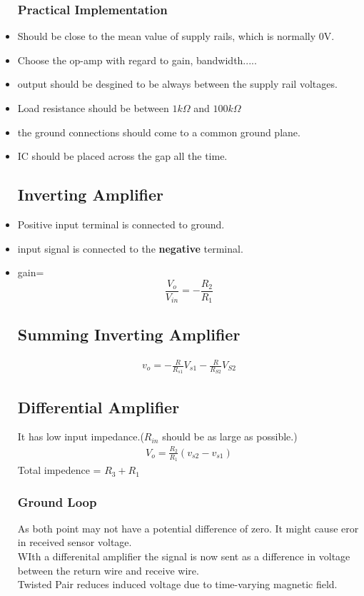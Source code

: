 \documentclass[12pt]{article}
\begin{document}
\begin{itemize}
\subsubsection{Practical Implementation}
\item Should be close to the mean value of supply rails, which is normally 0V.
\item Choose the op-amp with regard to gain, bandwidth.....
\item output should be desgined to be always between the supply rail voltages.
\item Load resistance should be between $1k\Omega$ and $100k\Omega$
\item the ground connections should come to a common ground plane.
\item IC should be placed across the gap all the time.

\subsection{Inverting Amplifier}
\item Positive input terminal is connected to ground.
\item input signal is connected to the \textbf{negative} terminal.
\item gain=
\begin{displaymath}
\frac{V_o}{V_{in}}=-\frac{R_2}{R_1}
\end{displaymath}

\subsection{Summing Inverting Amplifier}

\begin{align}
v_o=-\frac{R}{R_{s1}}V_{s1}-\frac{R}{R_{S2}}V_{S2}
\end{align}

\pagebreak
\subsection{Differential Amplifier}
It has low input impedance.($R_{in}$ should be as large as possible.)
\begin{align}
V_o=\frac{R_2}{R_1}(v_{s2}-v_{s1})
\end{align}
Total impedence = $R_3 + R_1$
\subsubsection{Ground Loop}
As both point may not have a potential difference of zero. It might cause eror in received sensor voltage. \\
WIth a differenital amplifier the signal is now sent as a difference in voltage between the return wire and receive wire. \\
Twisted Pair reduces induced voltage due to time-varying magnetic field.

\end{itemize}
\end{document}
